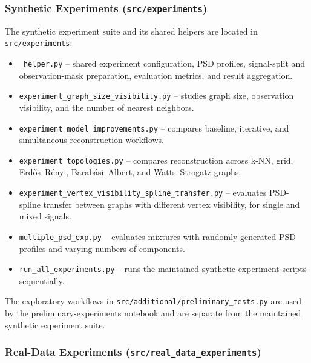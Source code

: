 \subsubsection{Synthetic Experiments (\texttt{src/experiments})}

The synthetic experiment suite and its shared helpers are located in \texttt{src/experiments}:
\begin{itemize}
    \item \texttt{\_helper.py} -- shared experiment configuration, PSD profiles, signal-split and observation-mask preparation, evaluation metrics, and result aggregation.
    \item \texttt{experiment\_graph\_size\_visibility.py} -- studies graph size, observation visibility, and the number of nearest neighbors.
    \item \texttt{experiment\_model\_improvements.py} -- compares baseline, iterative, and simultaneous reconstruction workflows.
    \item \texttt{experiment\_topologies.py} -- compares reconstruction across k-NN, grid, Erd\H{o}s--R\'enyi, Barab\'asi--Albert, and Watts--Strogatz graphs.
    \item \texttt{experiment\_vertex\_visibility\_spline\_transfer.py} -- evaluates PSD-spline transfer between graphs with different vertex visibility, for single and mixed signals.
    \item \texttt{multiple\_psd\_exp.py} -- evaluates mixtures with randomly generated PSD profiles and varying numbers of components.
    \item \texttt{run\_all\_experiments.py} -- runs the maintained synthetic experiment scripts sequentially.
\end{itemize}

The exploratory workflows in \texttt{src/additional/preliminary\_tests.py} are used by the preliminary-experiments notebook and are separate from the maintained synthetic experiment suite.

\subsubsection{Real-Data Experiments (\texttt{src/real\_data\_experiments})}

